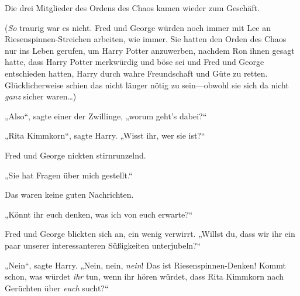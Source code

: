 Die drei Mitglieder des Ordens des Chaos kamen wieder zum Geschäft.

(\emph{So} traurig war es nicht. Fred und George würden noch immer mit Lee an Riesenspinnen-Streichen arbeiten, wie immer. Sie hatten den Orden des Chaos nur ins Leben gerufen, um Harry Potter anzuwerben, nachdem Ron ihnen gesagt hatte, dass Harry Potter merkwürdig und böse sei und Fred und George entschieden hatten, Harry durch wahre Freundschaft und Güte zu retten. Glücklicherweise schien das nicht länger nötig zu sein—obwohl sie sich da nicht \emph{ganz} sicher waren…)

„Also“, sagte einer der Zwillinge, „worum geht’s dabei?“

„Rita Kimmkorn“, sagte Harry. „Wisst ihr, wer sie ist?“

Fred und George nickten stirnrunzelnd.

„Sie hat Fragen über mich gestellt.“

Das waren keine guten Nachrichten.

„Könnt ihr euch denken, was ich von euch erwarte?“

Fred und George blickten sich an, ein wenig verwirrt. „Willst du, dass wir ihr ein paar unserer interessanteren Süßigkeiten unterjubeln?“

„Nein“, sagte Harry. „Nein, nein, \emph{nein}! Das ist Riesenspinnen-Denken! Kommt schon, was würdet \emph{ihr} tun, wenn ihr hören würdet, dass Rita Kimmkorn nach Gerüchten über \emph{euch} sucht?“


